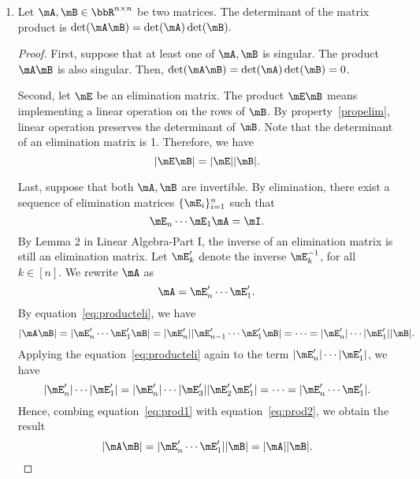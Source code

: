 \documentclass[11pt]{article}
\theoremstyle{plain}
\theoremstyle{definition}
\begin{document}
\begin{enumerate}
\begin{proof}
		($\Leftarrow$) If the determinant $\det(\mA) = 0$, the determinant of $RREF(\mA)$ is 0. Since the reduced row echelon form  of a matrix contains only distinct nonzero rows, the zero determinant implies that there exists at least one zero row in $RREF(\mA)$. Therefore, the matrix $\mA$ is singular.
	\end{proof}

	
	\item\label{propproduct} Let  $\mA, \mB \in \bbR^{n \times n}$ be two matrices. The determinant of the matrix product is $\det(\mA \mB) = \det(\mA) \det(\mB).$
	
	\begin{proof}
		First, suppose that at least one of $\mA, \mB$ is singular. The product $\mA \mB$ is also singular. Then, $\det(\mA \mB) = \det(\mA) \det(\mB) = 0$. 
		
		Second, let $\mE$ be an elimination matrix. The product $\mE \mB$ means implementing a linear operation on the rows of $\mB$. By property~\ref{propelim}, linear operation preserves the determinant of $\mB$. Note that the determinant of an elimination matrix is 1. Therefore, we have
		\begin{equation}\label{eq:producteli}
			|\mE \mB| = |\mE| |\mB|.
		\end{equation}
		
		Last, suppose that both $\mA, \mB$ are invertible. By elimination, there exist a sequence of elimination matrices $\{ \mE_i \}_{i = 1}^n$ such that 
		\[ \mE_n \cdots \mE_1 \mA = \mI.  \]
		By Lemma 2 in Linear Algebra-Part I, the inverse of an elimination matrix is still an elimination matrix. Let $\mE'_k$ denote the inverse $\mE^{-1}_k$, for all $k \in [n]$. We rewrite $\mA$ as
		\[ \mA = \mE'_n \cdots \mE'_1. \]
		By equation~\eqref{eq:producteli}, we have
		\begin{equation}\label{eq:prod1}
			|\mA \mB| = | \mE'_n \cdots \mE'_1 \mB | = |\mE'_n| |\mE'_{n-1} \cdots \mE'_1 \mB| = \cdots = |\mE'_n|\cdots |\mE'_1||\mB|. 
		\end{equation}
		Applying the equation~\eqref{eq:producteli} again to the term $|\mE'_n|\cdots |\mE'_1| $, we have
		\begin{equation}\label{eq:prod2}
			|\mE'_n|\cdots |\mE'_1|  =|\mE'_n|\cdots |\mE'_3| |\mE'_2 \mE'_1| = \cdots = | \mE'_n \cdots \mE'_1|.
		\end{equation}
		Hence, combing equation~\eqref{eq:prod1} with equation~\eqref{eq:prod2}, we obtain the result 
		\[ |\mA \mB|  = | \mE'_n \cdots \mE'_1| |\mB| = |\mA| |\mB|.\]
	\end{proof}
	

\end{enumerate}
\end{document}
